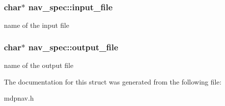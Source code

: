 \subsubsection[{\texorpdfstring{input\+\_\+file}{input_file}}]{\setlength{\rightskip}{0pt plus 5cm}char$\ast$ nav\+\_\+spec\+::input\+\_\+file}\hypertarget{structnav__spec_abb0e727791cf0839df7cea5433bff423}{}\label{structnav__spec_abb0e727791cf0839df7cea5433bff423}
name of the input file 
\subsubsection[{\texorpdfstring{output\+\_\+file}{output_file}}]{\setlength{\rightskip}{0pt plus 5cm}char$\ast$ nav\+\_\+spec\+::output\+\_\+file}\hypertarget{structnav__spec_a9d92be20ca9352274aa021679e5c2020}{}\label{structnav__spec_a9d92be20ca9352274aa021679e5c2020}
name of the output file 

The documentation for this struct was generated from the following file\+:\begin{DoxyCompactItemize}
\item 
mdpnav.\+h\end{DoxyCompactItemize}
